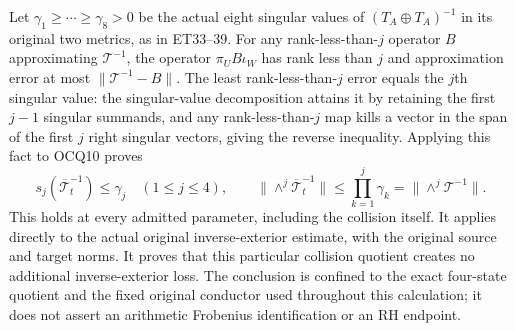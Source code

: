 \documentclass[11pt]{article}
\begin{document}
Let $\gamma_1\ge\cdots\ge\gamma_8>0$ be the actual eight singular
values of $(T_A\oplus T_A)^{-1}$ in its original two metrics, as in
ET33--39. For any rank-less-than-$j$ operator $B$ approximating
$\mathcal T^{-1}$, the operator $\pi_U B\iota_W$ has rank less than
$j$ and approximation error at most $\|\mathcal T^{-1}-B\|$.
The least rank-less-than-$j$ error equals the $j$th singular value:
the singular-value decomposition attains it by retaining the first
$j-1$ singular summands, and any rank-less-than-$j$ map kills a vector
in the span of the first $j$ right singular vectors, giving the reverse
inequality. Applying this fact to OCQ10 proves
\[
 s_j(\overline{\mathcal T}_t^{-1})\le\gamma_j\quad(1\le j\le4),
 \qquad
 \boxed{\|\wedge^j\overline{\mathcal T}_t^{-1}\|
       \le\prod_{k=1}^j\gamma_k
       =\|\wedge^j\mathcal T^{-1}\|.}
 \tag{OCQ11}
\]
This holds at every admitted parameter, including the collision itself.
It applies directly to the actual original inverse-exterior estimate,
with the original source and target norms. It proves that this
particular collision quotient creates no additional inverse-exterior
loss. The conclusion is confined to the exact four-state quotient
and the fixed original conductor used throughout this calculation;
it does not assert an arithmetic Frobenius identification or an RH
endpoint.
\end{document}
